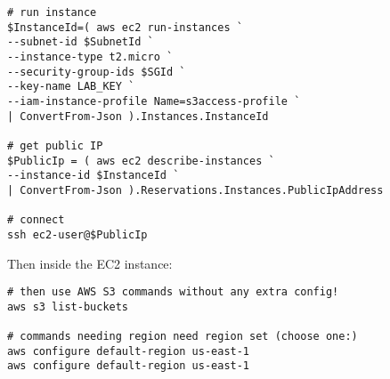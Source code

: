 \begin{verbatim}
# run instance 
$InstanceId=( aws ec2 run-instances `
--subnet-id $SubnetId `
--instance-type t2.micro `
--security-group-ids $SGId `
--key-name LAB_KEY `
--iam-instance-profile Name=s3access-profile `
| ConvertFrom-Json ).Instances.InstanceId

# get public IP
$PublicIp = ( aws ec2 describe-instances `
--instance-id $InstanceId `
| ConvertFrom-Json ).Reservations.Instances.PublicIpAddress

# connect
ssh ec2-user@$PublicIp
\end{verbatim}
Then inside the EC2 instance: 
\begin{verbatim}
# then use AWS S3 commands without any extra config!
aws s3 list-buckets 

# commands needing region need region set (choose one:)
aws configure default-region us-east-1
aws configure default-region us-east-1
\end{verbatim}
